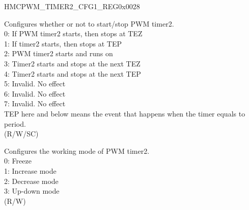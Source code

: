 \begin{register}{H}{MCPWM\_TIMER2\_CFG1\_REG}{0x0028}\label{regdesc:MCPWMTIMER2CFG1REG}
%
%
%
\regnewline%
\begin{regdesc}\begin{reglist}
\label{fielddesc:MCPWMTIMER2START}\item [MCPWM\_TIMER2\_START] Configures whether or not to start/stop PWM timer2.
\\0: If PWM timer2 starts, then stops at TEZ
\\1: If timer2 starts, then stops at TEP
\\2: PWM timer2 starts and runs on
\\3: Timer2 starts and stops at the next TEZ
\\4: Timer2 starts and stops at the next TEP
\\5: Invalid. No effect
\\6: Invalid. No effect
\\7: Invalid. No effect
\\TEP here and below means the event that happens when the timer equals to period. 
\\(R/W/SC)
\label{fielddesc:MCPWMTIMER2MOD}\item [MCPWM\_TIMER2\_MOD] Configures the working mode of PWM timer2.
\\0: Freeze
\\1: Increase mode
\\2: Decrease mode
\\3: Up-down mode
\\ (R/W)
\end{reglist}\end{regdesc}
\end{register}


